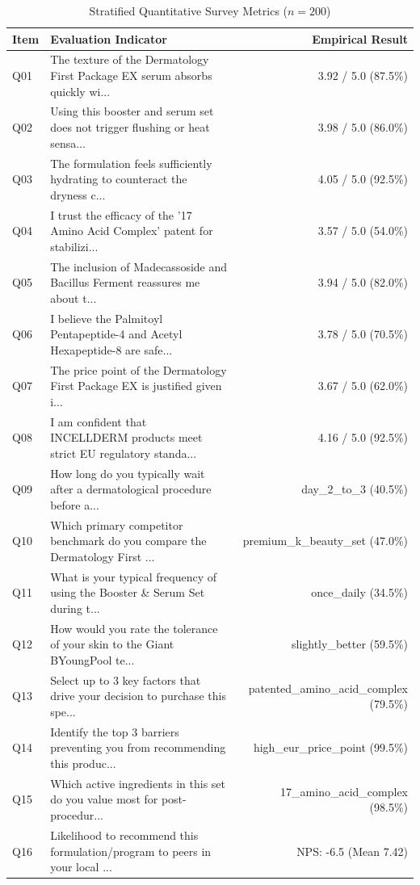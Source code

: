 \documentclass[10pt,twocolumn,a4paper]{article}
\begin{document}
\begin{table}[t]
\centering
\caption{Stratified Quantitative Survey Metrics ($n = 200$)}
\label{tab:metrics}
\small
\begin{tabularx}{\textwidth}{l X r}
\toprule
\textbf{Item} & \textbf{Evaluation Indicator} & \textbf{Empirical Result} \\
\midrule
Q01 & The texture of the Dermatology First Package EX serum absorbs quickly wi... & 3.92 / 5.0 (87.5\%) \\
Q02 & Using this booster and serum set does not trigger flushing or heat sensa... & 3.98 / 5.0 (86.0\%) \\
Q03 & The formulation feels sufficiently hydrating to counteract the dryness c... & 4.05 / 5.0 (92.5\%) \\
Q04 & I trust the efficacy of the '17 Amino Acid Complex' patent for stabilizi... & 3.57 / 5.0 (54.0\%) \\
Q05 & The inclusion of Madecassoside and Bacillus Ferment reassures me about t... & 3.94 / 5.0 (82.0\%) \\
Q06 & I believe the Palmitoyl Pentapeptide-4 and Acetyl Hexapeptide-8 are safe... & 3.78 / 5.0 (70.5\%) \\
Q07 & The price point of the Dermatology First Package EX is justified given i... & 3.67 / 5.0 (62.0\%) \\
Q08 & I am confident that INCELLDERM products meet strict EU regulatory standa... & 4.16 / 5.0 (92.5\%) \\
Q09 & How long do you typically wait after a dermatological procedure before a... & day\_2\_to\_3 (40.5\%) \\
Q10 & Which primary competitor benchmark do you compare the Dermatology First ... & premium\_k\_beauty\_set (47.0\%) \\
Q11 & What is your typical frequency of using the Booster \& Serum Set during t... & once\_daily (34.5\%) \\
Q12 & How would you rate the tolerance of your skin to the Giant BYoungPool te... & slightly\_better (59.5\%) \\
Q13 & Select up to 3 key factors that drive your decision to purchase this spe... & patented\_amino\_acid\_complex (79.5\%) \\
Q14 & Identify the top 3 barriers preventing you from recommending this produc... & high\_eur\_price\_point (99.5\%) \\
Q15 & Which active ingredients in this set do you value most for post-procedur... & 17\_amino\_acid\_complex (98.5\%) \\
Q16 & Likelihood to recommend this formulation/program to peers in your local ... & NPS: -6.5 (Mean 7.42) \\
\bottomrule
\end{tabularx}
\end{table}
\end{document}
